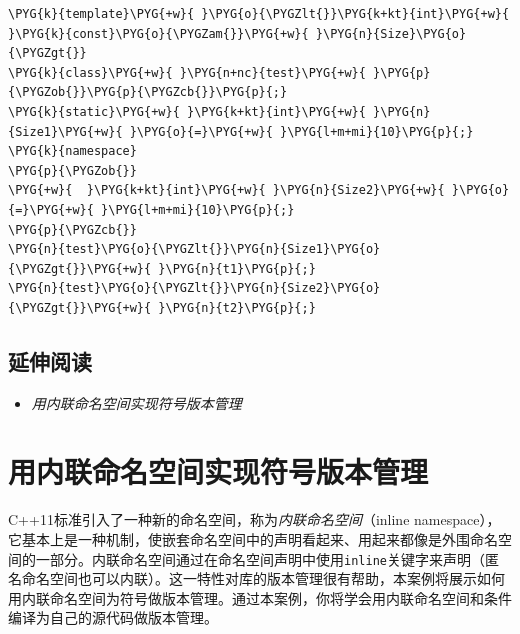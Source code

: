 
\begin{codeblockbg}
\begin{Verbatim}[commandchars=\\\{\},breaklines=true,breakanywhere=true,fontsize=\codefont,xleftmargin=17bp]
\PYG{k}{template}\PYG{+w}{ }\PYG{o}{\PYGZlt{}}\PYG{k+kt}{int}\PYG{+w}{ }\PYG{k}{const}\PYG{o}{\PYGZam{}}\PYG{+w}{ }\PYG{n}{Size}\PYG{o}{\PYGZgt{}}
\PYG{k}{class}\PYG{+w}{ }\PYG{n+nc}{test}\PYG{+w}{ }\PYG{p}{\PYGZob{}}\PYG{p}{\PYGZcb{}}\PYG{p}{;}
\PYG{k}{static}\PYG{+w}{ }\PYG{k+kt}{int}\PYG{+w}{ }\PYG{n}{Size1}\PYG{+w}{ }\PYG{o}{=}\PYG{+w}{ }\PYG{l+m+mi}{10}\PYG{p}{;}
\PYG{k}{namespace}
\PYG{p}{\PYGZob{}}
\PYG{+w}{  }\PYG{k+kt}{int}\PYG{+w}{ }\PYG{n}{Size2}\PYG{+w}{ }\PYG{o}{=}\PYG{+w}{ }\PYG{l+m+mi}{10}\PYG{p}{;}
\PYG{p}{\PYGZcb{}}
\PYG{n}{test}\PYG{o}{\PYGZlt{}}\PYG{n}{Size1}\PYG{o}{\PYGZgt{}}\PYG{+w}{ }\PYG{n}{t1}\PYG{p}{;}
\PYG{n}{test}\PYG{o}{\PYGZlt{}}\PYG{n}{Size2}\PYG{o}{\PYGZgt{}}\PYG{+w}{ }\PYG{n}{t2}\PYG{p}{;}
\end{Verbatim}
\end{codeblockbg}



\subsection{延伸阅读}



\begin{itemize}
\item \textit{用内联命名空间实现符号版本管理}

\end{itemize}



\section{用内联命名空间实现符号版本管理}



C++11标准引入了一种新的命名空间，称为\textit{内联命名空间}（inline namespace），它基本上是一种机制，使嵌套命名空间中的声明看起来、用起来都像是外围命名空间的一部分。内联命名空间通过在命名空间声明中使用\texttt{inline}关键字来声明（匿名命名空间也可以内联）。这一特性对库的版本管理很有帮助，本案例将展示如何用内联命名空间为符号做版本管理。通过本案例，你将学会用内联命名空间和条件编译为自己的源代码做版本管理。


